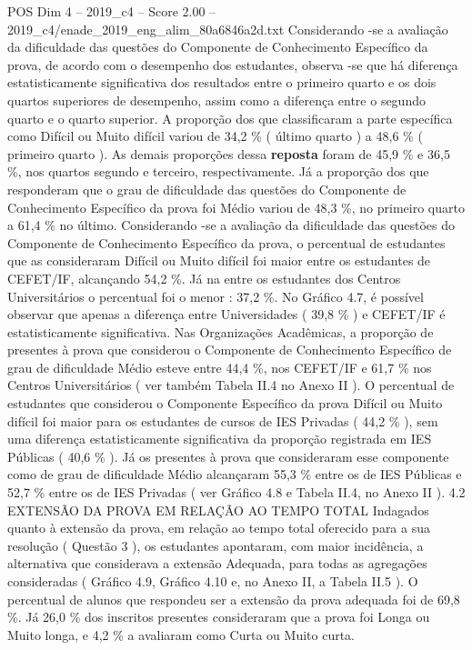 \begin{textsample}{POS Dim 4 – 2019\_c4 – Score 2.00 – 2019\_c4/enade\_2019\_eng\_alim\_80a6846a2d.txt}
Considerando -se a avaliação da dificuldade das questões do Componente de Conhecimento Específico da prova, de acordo com o desempenho dos estudantes, observa -se que há diferença estatisticamente significativa dos resultados entre o primeiro quarto e os dois quartos superiores de desempenho, assim como a diferença entre o segundo quarto e o quarto superior.
A proporção dos que classificaram a parte específica como Difícil ou Muito difícil variou de 34,2 \% ( último quarto ) a 48,6 \% ( primeiro quarto ).
As demais proporções dessa \textbf{reposta} foram de 45,9 \% e 36,5 \%, nos quartos segundo e terceiro, respectivamente.
Já a proporção dos que responderam que o grau de dificuldade das questões do Componente de Conhecimento Específico da prova foi Médio variou de 48,3 \%, no primeiro quarto a 61,4 \% no último.
Considerando -se a avaliação da dificuldade das questões do Componente de Conhecimento Específico da prova, o percentual de estudantes que as consideraram Difícil ou Muito difícil foi maior entre os estudantes de CEFET/IF, alcançando 54,2 \%.
Já na entre os estudantes dos Centros Universitários o percentual foi o menor : 37,2 \%.
No Gráfico 4.7, é possível observar que apenas a diferença entre Universidades ( 39,8 \% ) e CEFET/IF é estatisticamente significativa.
Nas Organizações Acadêmicas, a proporção de presentes à prova que considerou o Componente de Conhecimento Específico de grau de dificuldade Médio esteve entre 44,4 \%, nos CEFET/IF e 61,7 \% nos Centros Universitários ( ver também Tabela II.4 no Anexo II ).
O percentual de estudantes que considerou o Componente Específico da prova Difícil ou Muito difícil foi maior para os estudantes de cursos de IES Privadas ( 44,2 \% ), sem uma diferença estatisticamente significativa da proporção registrada em IES Públicas ( 40,6 \% ).
Já os presentes à prova que consideraram esse componente como de grau de dificuldade Médio alcançaram 55,3 \% entre os de IES Públicas e 52,7 \% entre os de IES Privadas ( ver Gráfico 4.8 e Tabela II.4, no Anexo II ). 4.2 EXTENSÃO DA PROVA EM RELAÇÃO AO TEMPO TOTAL Indagados quanto à extensão da prova, em relação ao tempo total oferecido para a sua resolução ( Questão 3 ), os estudantes apontaram, com maior incidência, a alternativa que considerava a extensão Adequada, para todas as agregações consideradas ( Gráfico 4.9, Gráfico 4.10 e, no Anexo II, a Tabela II.5 ).
O percentual de alunos que respondeu ser a extensão da prova adequada foi de 69,8 \%.
Já 26,0 \% dos inscritos presentes consideraram que a prova foi Longa ou Muito longa, e 4,2 \% a avaliaram como Curta ou Muito curta.

\end{textsample}
